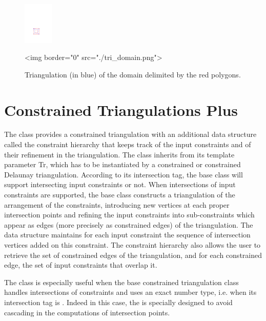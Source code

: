 \begin{figure}[ht]
\begin{center}
 \begin{ccTexOnly}
   \includegraphics[height=2cm]{Triangulation_2/tri_domain}
 \end{ccTexOnly}
 \begin{ccHtmlOnly}
   <img border="0" src="./tri_domain.png">
 \end{ccHtmlOnly}
   \label{figure:tri_domain}
\end{center}
\caption{Triangulation (in blue) of the domain delimited by the red polygons.}
\end{figure}



\section{Constrained Triangulations Plus\label{Section_2D_Triangulations_Constrained_Plus}}

The class 
provides a constrained triangulation with an additional data
structure called the  constraint hierarchy 
that keeps track of  the input constraints and of their refinement
in the triangulation.
The class 
inherits from its template parameter Tr, which has to be instantiated
by a constrained  or constrained Delaunay  triangulation.
According to its intersection tag, the base class
will support intersecting input constraints or not.
When intersections of input constraints are supported,
the base class constructs a triangulation  of the  arrangement
of the constraints,
introducing new vertices at each proper intersection
points and  refining the input constraints into sub-constraints
which appear as  edges (more precisely as constrained edges) of the
triangulation.  The  data structure maintains for each 
input constraint
the sequence of intersection vertices added on this constraint.
The constraint hierarchy also allows the user to retrieve the set
of constrained edges of the triangulation, and for each
constrained edge,  the set of input constraints that overlap it.

The class 
is especially useful when the base constrained triangulation class
handles intersections of constraints and uses an exact number type,
i.e. when its intersection tag is .
Indeed in this case, the 
is specially designed to avoid cascading in the computations of
intersection  points.

